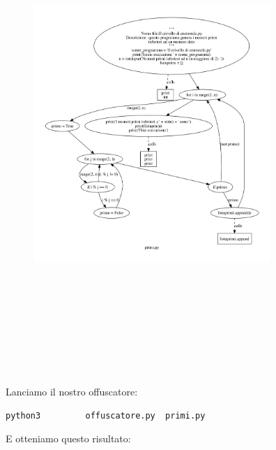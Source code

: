 \documentclass[a4paper,oneside,openright,titlepage,10pt,footinclude,headinclude]{scrbook}
\begin{document}
\begin{figure}[!h]
        \centering
        \includegraphics[height=18cm, width=9cm, keepaspectratio]{img/primi.png}
\end{figure}

Lanciamo il nostro offuscatore:

\begin{graybox}
\begin{lstlisting}[language=bash,basicstyle=\fontsize{10}{9}\selectfont,]
python3  		offuscatore.py 	primi.py
\end{lstlisting}
\end{graybox}

E otteniamo questo risultato:
\end{document}
